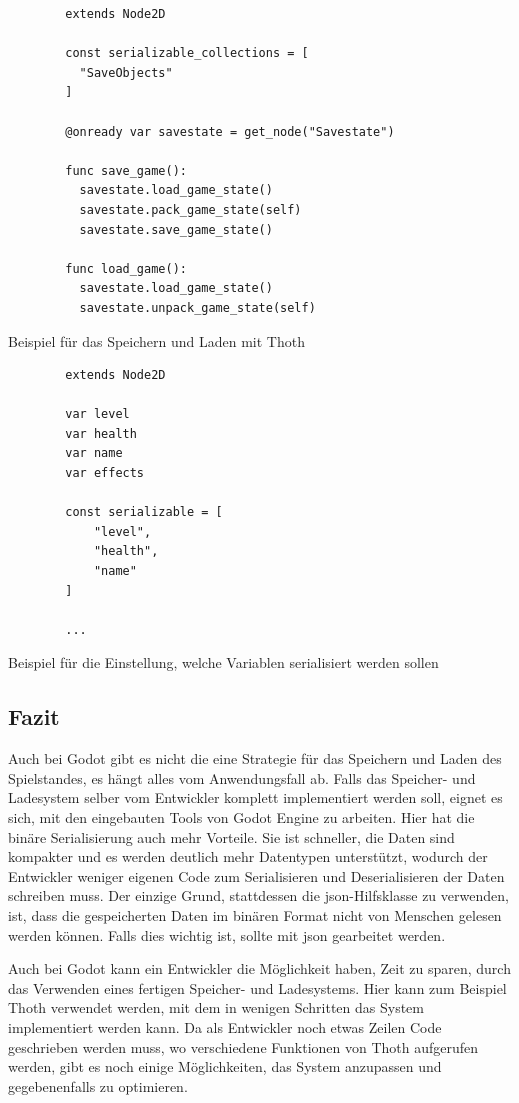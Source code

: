 \begin{listing}[htp]
    \begin{verbatim}
        extends Node2D

        const serializable_collections = [
          "SaveObjects"
        ]

        @onready var savestate = get_node("Savestate")

        func save_game():
          savestate.load_game_state()
          savestate.pack_game_state(self)  
          savestate.save_game_state()

        func load_game():
          savestate.load_game_state()
          savestate.unpack_game_state(self)
    \end{verbatim}
    \caption{Beispiel für das Speichern und Laden mit Thoth\cite{stupidratstudioGodotSaveLoad}}
    \label{lst:godotThoth}
\end{listing} 

\begin{listing}[htp]
    \begin{verbatim}
        extends Node2D

        var level
        var health
        var name
        var effects

        const serializable = [
            "level",
            "health",
            "name"
        ]

        ...
    \end{verbatim}
    \caption{Beispiel für die Einstellung, welche Variablen serialisiert werden sollen\cite{stupidratstudioGodotSaveLoad}}
    \label{lst:godotThothObject}
\end{listing} 



\subsection{Fazit}
Auch bei Godot gibt es nicht die eine Strategie für das Speichern und Laden des Spielstandes, es hängt alles vom Anwendungsfall ab. Falls das Speicher- und Ladesystem selber vom Entwickler komplett implementiert werden soll, eignet es sich, mit den eingebauten Tools von Godot Engine zu arbeiten. Hier hat die binäre Serialisierung auch mehr Vorteile. Sie ist schneller, die Daten sind kompakter und es werden deutlich mehr Datentypen unterstützt, wodurch der Entwickler weniger eigenen Code zum Serialisieren und Deserialisieren der Daten schreiben muss. Der einzige Grund, stattdessen die \ac{json}-Hilfsklasse zu verwenden, ist, dass die gespeicherten Daten im binären Format nicht von Menschen gelesen werden können. Falls dies wichtig ist, sollte mit \ac{json} gearbeitet werden.

Auch bei Godot kann ein Entwickler die Möglichkeit haben, Zeit zu sparen, durch das Verwenden eines fertigen Speicher- und Ladesystems. Hier kann zum Beispiel Thoth verwendet werden, mit dem in wenigen Schritten das System implementiert werden kann. Da als Entwickler noch etwas Zeilen Code geschrieben werden muss, wo verschiedene Funktionen von Thoth aufgerufen werden, gibt es noch einige Möglichkeiten, das System anzupassen und gegebenenfalls zu optimieren.